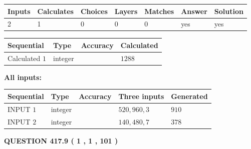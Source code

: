 \documentclass{ctexart}
\begin{document}
 
\noindent{}
 
 

 
   
   
   
   
\noindent\begin{tabular}{|l|l|l|l|l|l|l|}
 \hline
Inputs & Calculates & Choices & Layers & Matches & Answer & Solution \\ \hline
 2  & 
 1  & 
 0
  & 
 0  & 
 0  & 
  yes & 
  yes 
  \\ \hline
 \end{tabular}
   
   
   
   
\noindent{}
   
   
  
  
\noindent\begin{tabular}{|l|l|l|l|}
\hline
 Sequential & Type & Accuracy & Calculated \\ 
\hline
 
 
  Calculated $  1 $ & integer &  & 
  $ 1288 $ 
 \\  \hline  
 \end{tabular}
   
   
   
   
\noindent\vspace{0.1in}\hspace{-0.08in} {\textbf{\Large{All inputs: }}}
   
   
  
  
\noindent\begin{tabular}{|l|l|l|l|l|}
\hline
 Sequential & Type & Accuracy & Three inputs & Generated \\ 
\hline
 
 
  INPUT $  1 $ & integer &  & $
 520
 , 
 960
 , 
 3
 $ & $ 910 $ 
 \\  \hline  
 
 
  INPUT $  2 $ & integer &  & $
 140
 , 
 480
 , 
 7
 $ & $ 378 $ 
 \\  \hline  
 \end{tabular}
   
   
  
\vspace{0.2in}
  
{\textbf{\Large{QUESTION
417.9 
 ( 1 , 1 , 101 )
}}}
  
  
 
\end{document}
